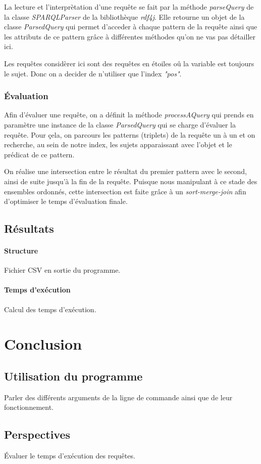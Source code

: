 \documentclass[12pt,titlepage]{article}
\begin{document}
La lecture et l'interprètation d'une requête se fait par la méthode \textit{parseQuery} de la classe \textit{SPARQLParser} de la bibliothèque \textit{rdf4j}. Elle retourne un objet de la classe \textit{ParsedQuery} qui permet d'acceder à chaque pattern de la requête ainsi que les attributs de ce pattern grâce à différentes méthodes qu'on ne vas pas détailler ici.

Les requêtes considèrer ici sont des requêtes en étoiles oû la variable est toujours le sujet. Donc on a decider de n'utiliser que l'index \textit{"pos"}.

\subsubsection{Évaluation}

Afin d'évaluer une requête, on a définit la méthode \textit{processAQuery} qui prends en paramètre une instance de la classe \textit{ParsedQuery} qui se charge d'évaluer la requête. Pour çela, on parcours les patterns (triplets) de la requête un à un et on recherche, au sein de notre index, les sujets apparaissant avec l'objet et le prédicat de ce pattern.

On réalise une intersection entre le résultat du premier pattern avec le second, ainsi de suite jusqu'à la fin de la requête. Puisque nous manipulant à ce stade des ensembles ordonnés, cette intersection est faite grâce à un \textit{sort-merge-join} afin d'optimiser le temps d'évaluation finale.

\subsection{Résultats}

\paragraph{Structure}

Fichier CSV en sortie du programme.

\paragraph{Temps d'exécution}

Calcul des temps d'exécution.

\section{Conclusion}

\subsection{Utilisation du programme}

Parler des différents arguments de la ligne de commande ainsi que de leur fonctionnement.

\subsection{Perspectives}

Évaluer le temps d'exécution des requêtes.
\end{document}
